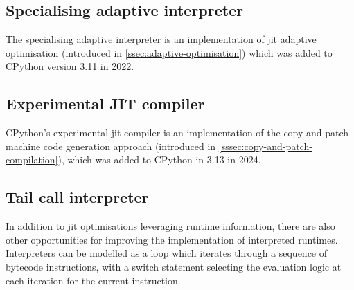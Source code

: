 \subsection{Specialising adaptive interpreter}
\label{ssec:specialising-adaptive-interpreter}


The specialising adaptive interpreter is an implementation of \ac{jit} adaptive optimisation (introduced in \autoref{ssec:adaptive-optimisation}) which was added to CPython version 3.11 in 2022.



\subsection{Experimental JIT compiler}
\label{ssec:experimental-jit-compiler}

CPython's experimental \ac{jit} compiler is an implementation of the copy-and-patch machine code generation approach (introduced in \autoref{sssec:copy-and-patch-compilation}), which was added to CPython in 3.13 in 2024.


\subsection{Tail call interpreter}
\label{ssec:tail-call-interpreter}

In addition to \ac{jit} optimisations leveraging runtime information, there are also other opportunities for improving the implementation of interpreted runtimes.
Interpreters can be modelled as a loop which iterates through a sequence of bytecode instructions, with a switch statement selecting the evaluation logic at each iteration for the current instruction.


